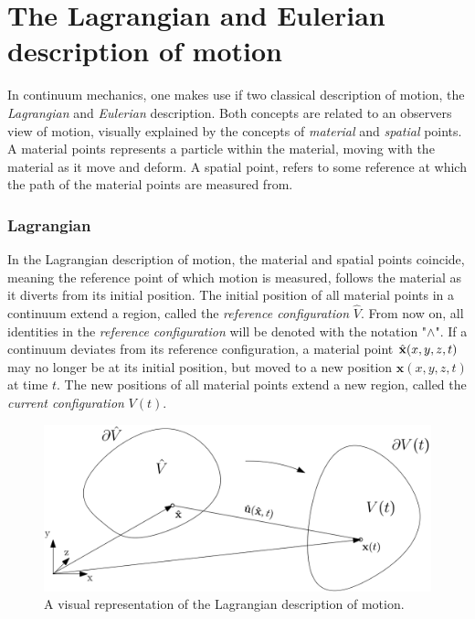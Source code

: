 \section{The Lagrangian and Eulerian description of motion}
In continuum mechanics, one makes use if two classical description of motion, the \textit{Lagrangian} and \textit{Eulerian} description. Both concepts are related to an observers view of motion, visually explained by the concepts of \textit{material} and \textit{spatial} points. A material points represents a particle within the material, moving with the material as it move and deform. A spatial point, refers to some reference at which the path of the material points are measured from. 

\subsubsection*{Lagrangian}
In the Lagrangian description of motion, the material and spatial points coincide, meaning the reference point of which motion is measured, follows the material as it diverts from its initial position. The initial position of all material points in a continuum extend a region, called the \textit{reference configuration} $\hat{V}$. From now on, all identities in the \textit{reference configuration} will be denoted with the notation "$\wedge$". If a continuum deviates from its reference configuration, a material point $\hat{\mathbf{x}}(x, y, z ,t)$ may no longer be at its initial position, but moved to a new position $\mathbf{x}(x, y, z, t)$ at time $t$.  The new positions of all material points extend a new region, called the \textit{current configuration} $V(t)$. 

\begin{figure}[h!]
  \centering
    \includegraphics[scale=0.4]{./Fig/lagframe.png}
      \caption{A visual representation of the Lagrangian description of motion.}
\end{figure}


